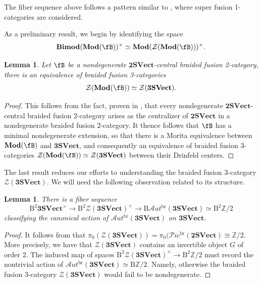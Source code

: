 \documentclass[11pt,reqno]{amsart}
\DeclareMathOperator{\br}{br}
\newcommand{\Mod}{\mathbf{Mod}}
\newcommand{\tSVect}{\mathbf{2SVect}}
\newcommand{\sPic}{\mathscr{P}ic}
\newcommand{\cZ}{\mathcal{Z}}
\newcommand{\sAut}{\mathscr{A}ut}
\newcommand{\rB}{\mathrm{B}}
\numberwithin{equation}{section}
\theoremstyle{plain}
\newtheorem{lem}[equation]{Lemma}
\theoremstyle{definition}
\begin{document}
The fiber sequence above follows a pattern similar to \cite[Section 5]{xu2025etale}, where super fusion 1-categories are considered.

As a preliminary result, we begin by identifying the space $$\mathbf{Bimod}(\Mod(\fB))^{\times}\simeq \mathbf{Mod}(\mathcal{Z}(\mathbf{Mod}(\fB)))^{\times}.$$

\begin{lem}\label{lem:SH6}
Let $\fB$ be a nondegenerate $\mathbf{2SVect}$-central braided fusion 2-category, there is an equivalence of braided fusion 3-categories $$\cZ(\Mod(\fB))\simeq \cZ(\mathbf{3SVect}).$$
\end{lem}
\begin{proof}
This follows from the fact, proven in \cite[Corollary V.4]{JF}, that every nondegenerate $\mathbf{2SVect}$-central braided fusion 2-category arises as the centralizer of $\tSVect$ in a nondegenerate braided fusion 2-category. It thence follows that $\fB$ has a minimal nondegenerate extension, so that there is a Morita equivalence between $\Mod(\fB)$ and $\mathbf{3SVect}$, and consequently an equivalence of braided fusion 3-categories $\cZ(\Mod(\fB))\simeq \cZ(\mathbf{3SVect})$ between their Drinfeld centers.
\end{proof}


The last result reduces our efforts to understanding the braided fusion 3-category $\mathcal{Z}(\mathbf{3SVect})$. We will need the following observation related to its structure.

\begin{lem}\label{lem:preenrichedfiebrsequence}
    There is a fiber sequence
    $$\rB^2\mathbf{3SVect}^{\times}\rightarrow \rB^2\mathcal{Z}(\mathbf{3SVect})^{\times}\rightarrow\rB\sAut^{\mathrm{br}}(\mathbf{3SVect})\simeq \rB^2\mathbb{Z}/2$$
    classifying the canonical action of $\sAut^{\mathrm{br}}(\mathbf{3SVect})$ on $\mathbf{3SVect}$.
\end{lem}
\begin{proof}
It follows from  that $\pi_0(\mathcal{Z}(\mathbf{3SVect}))=\pi_0(\sPic^{\br}(\mathbf{2SVect})\cong\mathbb{Z}/2$.
More precisely, we have that $\mathcal{Z}(\mathbf{3SVect})$ contains an invertible object $G$ of order $2$.
The induced map of spaces $\rB^2\mathcal{Z}(\mathbf{3SVect})^{\times}\rightarrow\rB^2\mathbb{Z}/2$ must record the nontrivial action of $\sAut^{\mathrm{br}}(\mathbf{3SVect})\simeq \rB\mathbb{Z}/2$. Namely, otherwise the braided fusion 3-category $\mathcal{Z}(\mathbf{3SVect})$ would fail to be nondegenerate.
\end{proof}
\end{document}
